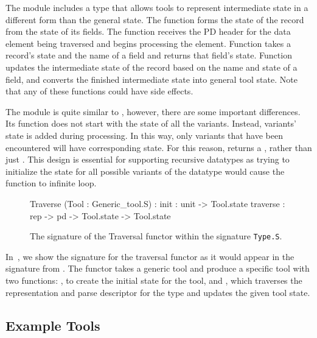 The  module includes a type  that allows
tools to represent intermediate state in a different form than the
general state. The  function forms the state of the record
from the state of its fields. The  function receives the PD
header for the data element being traversed and begins processing the
element. Function  takes a record's state and the name of
a field and returns that field's state. Function 
updates the intermediate state of the record based on the name and
state of a field, and  converts the finished intermediate
state into general tool state.  Note that any of these functions could
have side effects.

The  module is quite similar to , however,
there are some important differences. Its  function does not
start with the state of all the variants. Instead, variants' state is
added during processing. In this way, only variants that have been
encountered will have corresponding state. For this reason,
 returns a , rather than just .
This design is essential for supporting recursive datatypes as trying
to initialize the state for all possible variants of the datatype
would cause the  function to infinite loop.

\begin{figure}
\begin{code}\scriptsize
   Traverse (Tool : Generic_tool.S) :
     init : unit -> Tool.state
     traverse : rep -> pd -> Tool.state -> Tool.state
\end{code}
\caption{The signature of the Traversal functor within the signature \texttt{Type.S}.}
\label{fig:traversal-interface}
\end{figure}

In~, we show the signature for the
traversal functor as it would appear in the signature  from
. The functor takes a generic tool and produce
a specific tool with two functions: , to create the initial
state for the tool, and , which traverses the
representation and parse descriptor for the type and updates the given
tool state.

\subsection{Example Tools}
\label{sec:gentool-motivation-ex}

